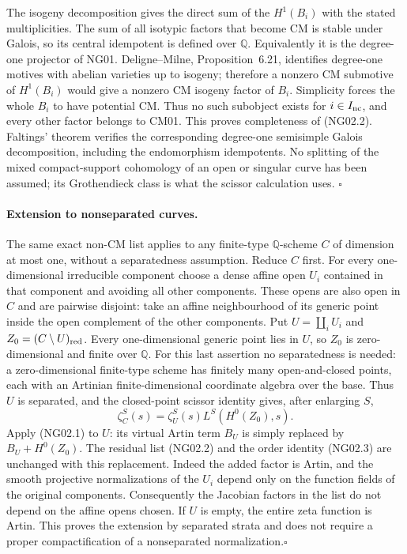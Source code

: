 The isogeny decomposition gives the direct sum of the $H^1(B_i)$ with
the stated multiplicities.  The sum of all isotypic factors that
become CM is stable under Galois, so its central idempotent is defined
over $\mathbb Q$.  Equivalently it is the degree-one projector of NG01.
Deligne--Milne, Proposition~6.21, identifies degree-one motives with
abelian varieties up to isogeny; therefore a nonzero CM submotive of
$H^1(B_i)$ would give a nonzero CM isogeny factor of $B_i$.  Simplicity
forces the whole $B_i$ to have potential CM.  Thus no such subobject
exists for $i\in I_{\rm nc}$, and every other factor belongs to CM01.
This proves completeness of (NG02.2).  Faltings' theorem verifies the
corresponding degree-one semisimple Galois decomposition, including
the endomorphism idempotents.  No splitting of the mixed
compact-support cohomology of an open or singular curve has been
assumed; its Grothendieck class is what the scissor calculation uses.
\hfill$\square$

\paragraph{Extension to nonseparated curves.}
The same exact non-CM list applies to any finite-type
$\mathbb Q$-scheme $C$ of dimension at most one, without a
separatedness assumption.  Reduce $C$ first.  For every
one-dimensional irreducible component choose a dense affine open
$U_i$ contained in that component and avoiding all other components.
These opens are also open in $C$ and are pairwise disjoint: take
an affine neighbourhood of its generic point inside the open
complement of the other components.  Put $U=\coprod_iU_i$ and
$Z_0=(C\setminus U)_{\rm red}$.  Every one-dimensional generic point
lies in $U$, so $Z_0$ is zero-dimensional and finite over $\mathbb Q$.
For this last assertion no separatedness is needed: a zero-dimensional
finite-type scheme has finitely many open-and-closed points, each
with an Artinian finite-dimensional coordinate algebra over the base.
Thus $U$ is separated, and the closed-point scissor identity gives,
after enlarging $S$,
\[
               \zeta_C^S(s)=\zeta_U^S(s)L^S(H^0(Z_0),s).
                                                               \tag{NG02.4}
\]
Apply (NG02.1) to $U$: its virtual Artin term $B_U$ is simply
replaced by $B_U+H^0(Z_0)$.  The residual list (NG02.2) and the
order identity (NG02.3) are unchanged with this replacement.
Indeed the added factor is Artin, and the smooth projective
normalizations of the $U_i$ depend only on the function fields of
the original components.  Consequently the Jacobian factors in
the list do not depend on the affine opens chosen.  If $U$ is empty,
the entire zeta function is Artin.  This proves the extension by
separated strata and does not require a proper compactification
of a nonseparated normalization.\hfill$\square$

